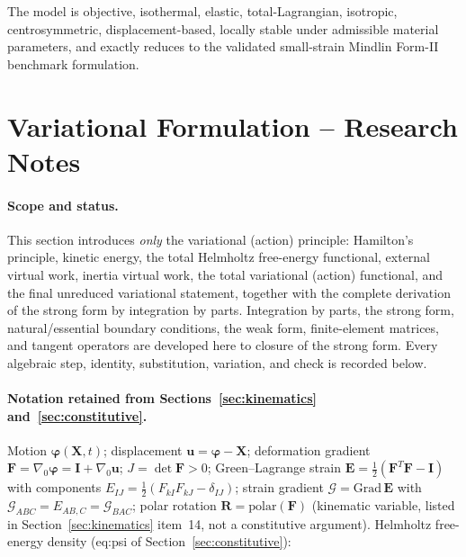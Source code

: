 \documentclass[11pt]{article}
\begin{document}
The model is objective, isothermal, elastic, total-Lagrangian, isotropic, centrosymmetric, displacement-based, locally stable under admissible material parameters, and exactly reduces to the validated small-strain Mindlin Form-II benchmark formulation.

\section{Variational Formulation -- Research Notes}
\label{sec:variational}

\paragraph{Scope and status.}

This section introduces \emph{only} the variational (action) principle: Hamilton's principle, kinetic energy, the total Helmholtz free-energy functional, external virtual work, inertia virtual work, the total variational (action) functional, and the final unreduced variational statement, together with the complete derivation of the strong form by integration by parts. Integration by parts, the strong form, natural/essential boundary conditions, the weak form, finite-element matrices, and tangent operators are developed here to closure of the strong form. Every algebraic step, identity, substitution, variation, and check is recorded below.

\paragraph{Notation retained from Sections~\ref{sec:kinematics} and~\ref{sec:constitutive}.}

Motion $\boldsymbol{\varphi}(\mathbf{X},t)$; displacement $\mathbf{u}=\boldsymbol{\varphi}-\mathbf{X}$; deformation gradient $\mathbf{F}=\nabla_{0}\boldsymbol{\varphi}=\mathbf{I}+\nabla_{0}\mathbf{u}$; $J=\det\mathbf{F}>0$; Green--Lagrange strain $\mathbf{E}=\tfrac12(\mathbf{F}^{T}\mathbf{F}-\mathbf{I})$ with components $E_{IJ}=\tfrac12(F_{kI}F_{kJ}-\delta_{IJ})$; strain gradient $\bm{\mathcal{G}}=\mathrm{Grad}\,\mathbf{E}$ with $\mathcal{G}_{ABC}=E_{AB,C}=\mathcal{G}_{BAC}$; polar rotation $\mathbf{R}=\mathrm{polar}(\mathbf{F})$ (kinematic variable, listed in Section~\ref{sec:kinematics} item~14, not a constitutive argument). Helmholtz free-energy density (eq:psi of Section~\ref{sec:constitutive}):
\end{document}
